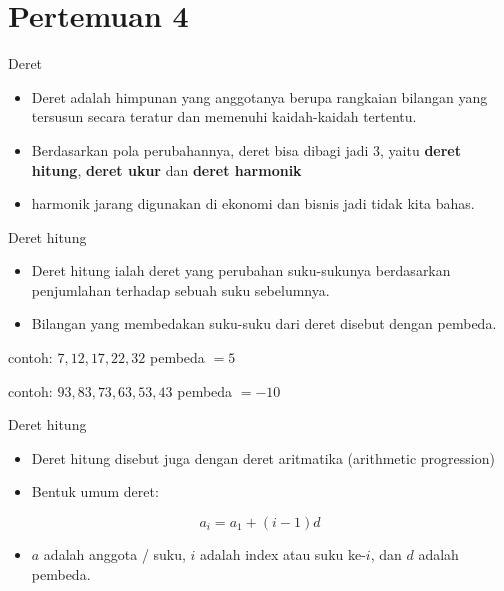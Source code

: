 \documentclass[
  ignorenonframetext,
]{beamer}
\providecommand{\tightlist}{%
  \setlength{\itemsep}{0pt}\setlength{\parskip}{0pt}}\usepackage{longtable,booktabs,array}
\begin{document}
\section{Pertemuan 4}\label{pertemuan-4}

\begin{frame}{Deret}
\label{deret}
\begin{itemize}
\item
  Deret adalah himpunan yang anggotanya berupa rangkaian bilangan yang
  tersusun secara teratur dan memenuhi kaidah-kaidah tertentu.
\item
  Berdasarkan pola perubahannya, deret bisa dibagi jadi 3, yaitu
  \textbf{deret hitung}, \textbf{deret ukur} dan \textbf{deret harmonik}
\item
  harmonik jarang digunakan di ekonomi dan bisnis jadi tidak kita bahas.
\end{itemize}
\end{frame}

\begin{frame}{Deret hitung}
\label{deret-hitung}
\begin{itemize}
\item
  Deret hitung ialah deret yang perubahan suku-sukunya berdasarkan
  penjumlahan terhadap sebuah suku sebelumnya.
\item
  Bilangan yang membedakan suku-suku dari deret disebut dengan pembeda.
\end{itemize}

contoh: \(7,12,17,22,32\) pembeda \(=5\)

contoh: \(93, 83, 73,63,53,43\) pembeda \(=-10\)
\end{frame}

\begin{frame}{Deret hitung}
\label{deret-hitung-1}
\begin{itemize}
\item
  Deret hitung disebut juga dengan deret aritmatika (arithmetic
  progression)
\item
  Bentuk umum deret:
\end{itemize}

\[
a_i=a_1+(i-1)d
\]

\begin{itemize}
\tightlist
\item
  \(a\) adalah anggota / suku, \(i\) adalah index atau suku ke-\(i\),
  dan \(d\) adalah pembeda.
\end{itemize}
\end{frame}
\end{document}
